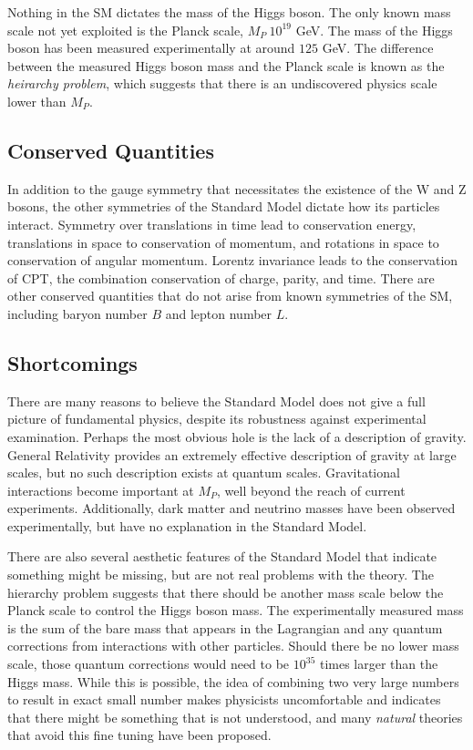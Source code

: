Nothing in the \ac{SM} dictates the mass of the Higgs boson. The only known mass scale not yet exploited is the Planck scale, $M_P ~{} 10^{19}$ GeV. The mass of the Higgs boson has been measured experimentally at around $125$ GeV. The difference between the measured Higgs boson mass and the Planck scale is known as the \emph{heirarchy problem}, which suggests that there is an undiscovered physics scale lower than $M_P$. 


\subsection{Conserved Quantities}

In addition to the gauge symmetry that necessitates the existence of the W and Z bosons, the other symmetries of the Standard Model dictate how its particles interact. Symmetry over translations in time lead to conservation energy, translations in space to conservation of momentum, and rotations in space to conservation of angular momentum. Lorentz invariance leads to the conservation of CPT, the combination conservation of charge, parity, and time. There are other conserved quantities that do not arise from known symmetries of the \ac{SM}, including baryon number $B$ and lepton number $L$. 


\subsection{Shortcomings}
There are many reasons to believe the Standard Model does not give a full picture of fundamental physics, despite its robustness against experimental examination. Perhaps the most obvious hole is the lack of a description of gravity. General Relativity provides an extremely effective description of gravity at large scales, but no such description exists at quantum scales. Gravitational interactions become important at $M_P$, well beyond the reach of current experiments. Additionally, dark matter and neutrino masses have been observed experimentally, but have no explanation in the Standard Model. 

There are also several aesthetic features of the Standard Model that indicate something might be missing, but are not real problems with the theory. The hierarchy problem suggests that there should be another mass scale below the Planck scale to control the Higgs boson mass. The experimentally measured mass is the sum of the bare mass that appears in the Lagrangian and any quantum corrections from interactions with other particles. Should there be no lower mass scale, those quantum corrections would need to be $10^{35}$ times larger than the Higgs mass. While this is possible, the idea of combining two very large numbers to result in exact small number makes physicists uncomfortable and indicates that there might be something that is not understood, and many \emph{natural} theories that avoid this fine tuning have been proposed.

